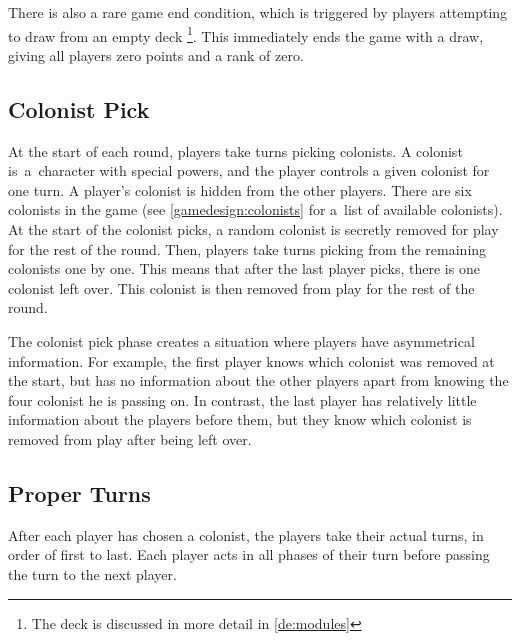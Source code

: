 There is also a rare game end condition, which is triggered by players attempting to
draw from an empty deck
\footnote{The deck is discussed in more detail in \autoref{de:modules}}.
This immediately ends the game with a draw, giving all
players zero points and a rank of zero.

\subsection{Colonist Pick}

At the start of each round, players take turns picking colonists. A colonist is~a~character
with special powers, and the player controls a given colonist for one turn. A player's
colonist is hidden from the other players.
There are six colonists in the game (see \autoref{gamedesign:colonists} for a~list
of available colonists). At the start of the colonist picks, a random colonist is
secretly removed for play for the rest of the round. Then, players take turns
picking from the remaining colonists one by one. This means that after the last
player picks, there is one colonist left over. This colonist is then removed from
play for the rest of the round.

The colonist pick phase creates a situation where players have asymmetrical information.
For example, the first player knows which colonist was removed at the start, but has
no information about the other players apart from knowing the four colonist he is passing
on. In contrast, the last player has relatively little information about the players
before them, but they know which colonist is removed from play after being left over.

\subsection{Proper Turns}

After each player has chosen a colonist, the players take their actual turns, in order
of first to last. Each player acts in all phases of their turn before passing the turn
to the next player.

